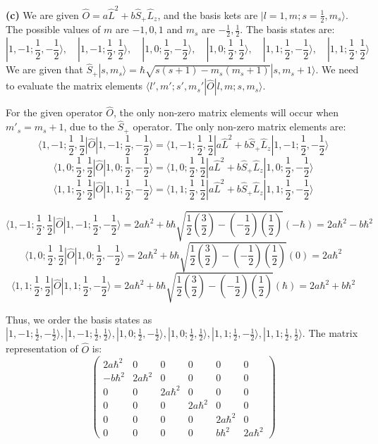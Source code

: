 \documentclass{article}
\begin{document}
\textbf{(c)} We are given \(\hat{O} = a \hat{L}^2 + b \hat{S}_+ \hat{L}_z\), and the basis kets are \(|l=1, m; s=\frac{1}{2}, m_s\rangle\). The possible values of \(m\) are \(-1, 0, 1\) and \(m_s\) are \(-\frac{1}{2}, \frac{1}{2}\). The basis states are:
\[
|1, -1; \frac{1}{2}, -\frac{1}{2}\rangle, \quad |1, -1; \frac{1}{2}, \frac{1}{2}\rangle, \quad |1, 0; \frac{1}{2}, -\frac{1}{2}\rangle, \quad |1, 0; \frac{1}{2}, \frac{1}{2}\rangle, \quad |1, 1; \frac{1}{2}, -\frac{1}{2}\rangle, \quad |1, 1; \frac{1}{2}, \frac{1}{2}\rangle
\]
We are given that \(\hat{S}_+ |s, m_s\rangle = \hbar \sqrt{s(s+1) - m_s(m_s+1)} |s, m_s+1\rangle\). We need to evaluate the matrix elements \(\langle l', m'; s', m_s' | \hat{O} | l, m; s, m_s \rangle\).

For the given operator \(\hat{O}\), the only non-zero matrix elements will occur when \(m'_s = m_s + 1\), due to the \(\hat{S}_+\) operator.
The only non-zero matrix elements are:
\[
\langle 1, -1; \frac{1}{2}, \frac{1}{2} | \hat{O} | 1, -1; \frac{1}{2}, -\frac{1}{2} \rangle = \langle 1, -1; \frac{1}{2}, \frac{1}{2} | a \hat{L}^2 + b \hat{S}_+ \hat{L}_z | 1, -1; \frac{1}{2}, -\frac{1}{2} \rangle
\]
\[
\langle 1, 0; \frac{1}{2}, \frac{1}{2} | \hat{O} | 1, 0; \frac{1}{2}, -\frac{1}{2} \rangle = \langle 1, 0; \frac{1}{2}, \frac{1}{2} | a \hat{L}^2 + b \hat{S}_+ \hat{L}_z | 1, 0; \frac{1}{2}, -\frac{1}{2} \rangle
\]
\[
\langle 1, 1; \frac{1}{2}, \frac{1}{2} | \hat{O} | 1, 1; \frac{1}{2}, -\frac{1}{2} \rangle = \langle 1, 1; \frac{1}{2}, \frac{1}{2} | a \hat{L}^2 + b \hat{S}_+ \hat{L}_z | 1, 1; \frac{1}{2}, -\frac{1}{2} \rangle
\]

\[
\langle 1, -1; \frac{1}{2}, \frac{1}{2} | \hat{O} | 1, -1; \frac{1}{2}, -\frac{1}{2} \rangle = 2a\hbar^2 + b\hbar\sqrt{\frac{1}{2}(\frac{3}{2}) - (-\frac{1}{2})(\frac{1}{2})} (-\hbar) = 2a\hbar^2 - b\hbar^2
\]
\[
\langle 1, 0; \frac{1}{2}, \frac{1}{2} | \hat{O} | 1, 0; \frac{1}{2}, -\frac{1}{2} \rangle = 2a\hbar^2 + b\hbar\sqrt{\frac{1}{2}(\frac{3}{2}) - (-\frac{1}{2})(\frac{1}{2})} (0) = 2a\hbar^2
\]
\[
\langle 1, 1; \frac{1}{2}, \frac{1}{2} | \hat{O} | 1, 1; \frac{1}{2}, -\frac{1}{2} \rangle = 2a\hbar^2 + b\hbar\sqrt{\frac{1}{2}(\frac{3}{2}) - (-\frac{1}{2})(\frac{1}{2})} (\hbar) = 2a\hbar^2 + b\hbar^2
\]

Thus, we order the basis states as \(|1, -1; \frac{1}{2}, -\frac{1}{2}\rangle, |1, -1; \frac{1}{2}, \frac{1}{2}\rangle, |1, 0; \frac{1}{2}, -\frac{1}{2}\rangle, |1, 0; \frac{1}{2}, \frac{1}{2}\rangle, |1, 1; \frac{1}{2}, -\frac{1}{2}\rangle, |1, 1; \frac{1}{2}, \frac{1}{2}\rangle\).
The matrix representation of \(\hat{O}\) is:
\[
\begin{pmatrix}
2a\hbar^2 & 0 & 0 & 0 & 0 & 0 \\
-b\hbar^2 & 2a\hbar^2 & 0 & 0 & 0 & 0 \\
0 & 0 & 2a\hbar^2 & 0 & 0 & 0 \\
0 & 0 & 0 & 2a\hbar^2 & 0 & 0 \\
0 & 0 & 0 & 0 & 2a\hbar^2 & 0 \\
0 & 0 & 0 & 0 & b\hbar^2 & 2a\hbar^2
\end{pmatrix}
\]
\end{document}
